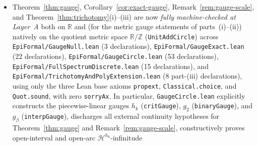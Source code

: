 \documentclass[11pt]{article}
\theoremstyle{definition}
\theoremstyle{remark}
\newcommand{\R}{\mathbb{R}}
\newcommand{\Z}{\mathbb{Z}}
\newcommand{\Lam}{\Lambda}
\begin{document}
\begin{itemize}[leftmargin=1.5em]
and~\ref{conj:weight} ($0\le\alpha<1$, prescribed limits, sublevel sets for all
$c\ge0$, and the zero-level set) are \emph{fully machine-checked at Layer~A}
(both the upper and lower bounds). The upper bound is proved in
\texttt{Weighted\allowbreak Fiber.lean}, \texttt{Weighted\allowbreak DimHCore.lean},
\texttt{Weighted\allowbreak Upper.lean}, and \texttt{Weighted\allowbreak Final.lean}
(as \texttt{dimH\_\allowbreak levelSet\ensuremath{\alpha}\_le}); the
matching lower bound and exact dimension identities are proved in
\texttt{Weighted\allowbreak ExactDim.lean}
(as \texttt{one\_\allowbreak le\_\allowbreak hausdorff\allowbreak Measure\_\allowbreak cantorSet},
\texttt{dimH\_\allowbreak exact\allowbreak LimitSet\ensuremath{\alpha}\_ge},
\texttt{dimH\_\allowbreak exact\allowbreak LimitSet\ensuremath{\alpha}\_eq},
\texttt{dimH\_\allowbreak levelSet\ensuremath{\alpha}\_eq}, and
\texttt{dimH\_\allowbreak appr\allowbreak Exponent\ensuremath{\alpha}\_eq\_\allowbreak zero}; base
axioms only, no \texttt{sorryAx}). The existence of $x_0$ with $\Lam(x_0)=1/4$
(as \texttt{lambda\_\allowbreak x0\_\allowbreak eq\_\allowbreak quarter} in \texttt{Quarter\allowbreak Point\allowbreak Final.lean}) and the
unweighted-zero strictness witness
(\texttt{Unweighted\allowbreak Correction.\allowbreak witness} in Remark~\ref{rem:unweighted})
are likewise kernel-checked at Layer~A.
\item Theorem~\ref{thm:gauge}, Corollary~\ref{cor:exact-gauge},
Remark~\ref{rem:gauge-scale}, and Theorem~\ref{thm:trichotomy}(i)--(iii) are now
\emph{fully machine-checked at Layer~A} both on $\R$ and (for the metric gauge
statements of parts~(i)--(ii)) natively on the
quotient metric space $\R/\Z$ (\texttt{UnitAddCircle}) across
\texttt{EpiFormal/\allowbreak GaugeNull.lean} (3 declarations),
\texttt{EpiFormal/\allowbreak GaugeExact.lean} (22 declarations),
\texttt{EpiFormal/\allowbreak GaugeCircle.lean} (53 declarations),
\texttt{EpiFormal/\allowbreak FullSpectrumDiscrete.lean} (15 declarations), and
\texttt{EpiFormal/\allowbreak TrichotomyAndPolyExtension.lean} (8 part-(iii)
declarations), using only
the three Lean base axioms \texttt{propext}, \texttt{Classical.choice}, and
\texttt{Quot.sound}, with zero \texttt{sorryAx}. In particular,
\texttt{GaugeCircle.lean} explicitly constructs the piecewise-linear gauges
$h_k$ (\texttt{critGauge}), $g_2$ (\texttt{binaryGauge}), and $g_\beta$
(\texttt{interpGauge}), discharges all external continuity hypotheses for
Theorem~\ref{thm:gauge} and Remark~\ref{rem:gauge-scale}, constructively proves
open-interval and open-arc $\mathcal H^{h_k}$-infinitude

\end{itemize}
\end{document}
